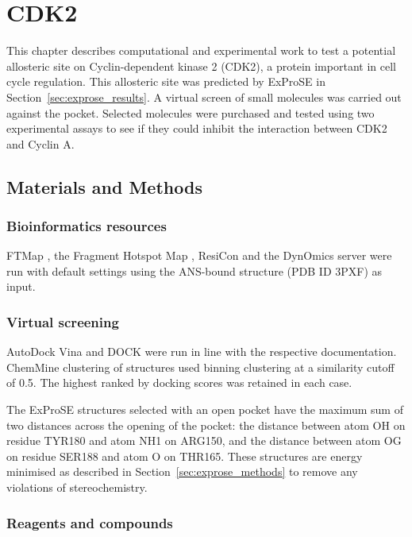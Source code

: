 \chapter{CDK2}
\label{cha:cdk2}

This chapter describes computational and experimental work to test a potential allosteric site on Cyclin-dependent kinase 2 (CDK2), a protein important in cell cycle regulation.
This allosteric site was predicted by ExProSE in Section~\ref{sec:exprose_results}.
A virtual screen of small molecules was carried out against the pocket.
Selected molecules were purchased and tested using two experimental assays to see if they could inhibit the interaction between CDK2 and Cyclin A.


\section{Materials and Methods}
\label{sec:cdk2_methods}


\subsection{Bioinformatics resources}

FTMap \cite{Kozakov2015}, the Fragment Hotspot Map \cite{Radoux2016}, ResiCon \cite{Dziubinski2016} and the DynOmics server \cite{Li2017} were run with default settings using the ANS-bound structure (PDB ID 3PXF) as input.


\subsection{Virtual screening}

AutoDock Vina and DOCK were run in line with the respective documentation.
ChemMine clustering of structures used binning clustering at a similarity cutoff of 0.5.
The highest ranked by docking scores was retained in each case.

The ExProSE structures selected with an open pocket have the maximum sum of two distances across the opening of the pocket: the distance between atom OH on residue TYR180 and atom NH1 on ARG150, and the distance between atom OG on residue SER188 and atom O on THR165.
These structures are energy minimised as described in Section~\ref{sec:exprose_methods} to remove any violations of stereochemistry.


\subsection{Reagents and compounds}

